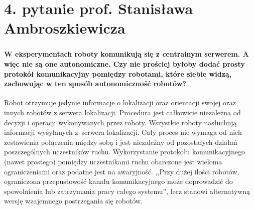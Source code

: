 \section*{4. pytanie prof. Stanisława Ambroszkiewicza}
\begin{frame}
\frametitle{\secname}
\framesubtitle{\tiny{W eksperymentach roboty komunikują się z centralnym serwerem. A więc nie są one autonomiczne.  Czy nie prościej byłoby dodać prosty protokół komunikacyjny pomiędzy robotami, które siebie widzą, zachowując w ten sposób autonomiczność robotów?}}

Robot otrzymuje jedynie informacje o lokalizacji  oraz orientacji swojej oraz innych robotów z serwera lokalizacji. Procedura jest całkowicie niezależna od decyzji i operacji  wykonywanych przez roboty. Wszystkie roboty nasłuchują informacji wysyłanych z~serwera lokalizacji. Cały proces nie wymaga od nich zestawienia połączenia między sobą i jest niezależny od pozostałych działań poszczególnych uczestników ruchu. 
\newline
\newline
Wykorzystanie protokołu komunikacyjnego (nawet prostego) pomiędzy uczestnikami ruchu obarczone jest wieloma ograniczeniami oraz podatne jest na awaryjność. ,,Przy dużej ilości robotów, ograniczona przepustowość kanału komunikacyjnego może doprowadzić do spowolnienia lub zatrzymania pracy całego systemu'', lecz stanowi alternatywną wersję wzajemnego postrzegania się robotów.


\end{frame}
